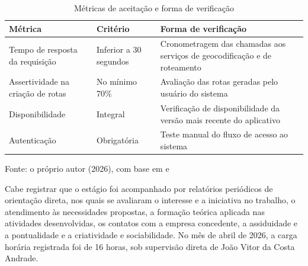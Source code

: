 \begin{table}[!ht]
    \centering
    \caption{Métricas de aceitação e forma de verificação}
    \label{tab:metricas}
    \begin{tabular}{p{6cm} p{4cm} p{5cm}}
        \hline
        \textbf{Métrica} & \textbf{Critério} & \textbf{Forma de verificação} \\
        \hline
        Tempo de resposta da requisição & Inferior a 30 segundos & Cronometragem das chamadas aos serviços de geocodificação e de roteamento \\
        \hline
        Assertividade na criação de rotas & No mínimo 70\% & Avaliação das rotas geradas pelo usuário do sistema \\
        \hline
        Disponibilidade & Integral & Verificação de disponibilidade da versão mais recente do aplicativo \\
        \hline
        Autenticação & Obrigatória & Teste manual do fluxo de acesso ao sistema \\
        \hline
    \end{tabular}
    \vspace{2pt}
    \footnotesize Fonte: o próprio autor (2026), com base em  e 
\end{table}

Cabe registrar que o estágio foi acompanhado por relatórios periódicos de orientação direta, nos quais se avaliaram o interesse e a iniciativa no trabalho, o atendimento às necessidades propostas, a formação teórica aplicada nas atividades desenvolvidas, os contatos com a empresa concedente, a assiduidade e a pontualidade e a criatividade e sociabilidade. No mês de abril de 2026, a carga horária registrada foi de 16 horas, sob supervisão direta de João Vitor da Costa Andrade.
